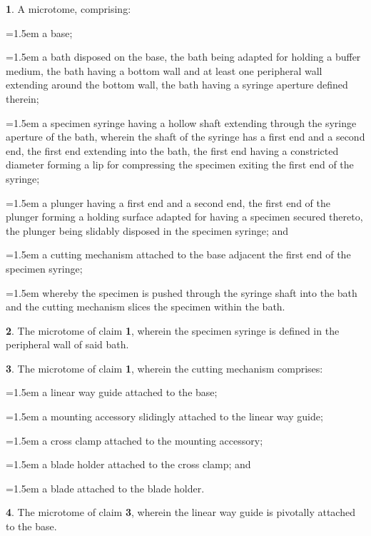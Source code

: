 \documentclass{article}
\begin{document}
\begin{hangpars}
\textbf{1}. A microtome, comprising:

{\leftskip=1.5em\parindent=0pt a base;\par}
{\leftskip=1.5em\parindent=0pt a bath disposed on the base, the bath being adapted for holding a buffer medium, the bath having a bottom wall and at least one peripheral wall extending around the bottom wall, the bath having a syringe aperture defined therein;\par}
{\leftskip=1.5em\parindent=0pt a specimen syringe having a hollow shaft extending through the syringe aperture of the bath, wherein the shaft of the syringe has a first end and a second end, the first end extending into the bath, the first end having a constricted diameter forming a lip for compressing the specimen exiting the first end of the syringe;\par}
{\leftskip=1.5em\parindent=0pt a plunger having a first end and a second end, the first end of the plunger forming a holding surface adapted for having a specimen secured thereto, the plunger being slidably disposed in the specimen syringe; and\par}
{\leftskip=1.5em\parindent=0pt a cutting mechanism attached to the base adjacent the first end of the specimen syringe;\par}
{\leftskip=1.5em\parindent=0pt whereby the specimen is pushed through the syringe shaft into the bath and the cutting mechanism slices the specimen within the bath.\par}

\textbf{2}. The microtome of claim \textbf{1}, wherein the specimen syringe is defined in the peripheral wall of said bath.

\textbf{3}. The microtome of claim \textbf{1}, wherein the cutting mechanism comprises:

{\leftskip=1.5em\parindent=0pt a linear way guide attached to the base;\par}
{\leftskip=1.5em\parindent=0pt a mounting accessory slidingly attached to the linear way guide;\par}
{\leftskip=1.5em\parindent=0pt a cross clamp attached to the mounting accessory;\par}
{\leftskip=1.5em\parindent=0pt a blade holder attached to the cross clamp; and\par}
{\leftskip=1.5em\parindent=0pt a blade attached to the blade holder.\par}

\textbf{4}. The microtome of claim \textbf{3}, wherein the linear way guide is pivotally attached to the base.


\end{hangpars}
\end{document}
